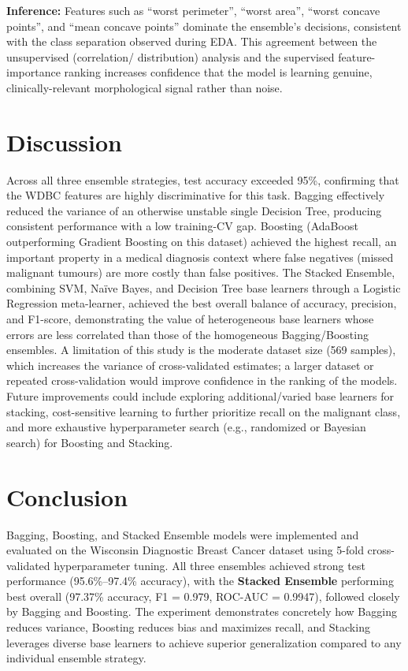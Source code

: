 \documentclass[12pt,a4paper]{article}
\begin{document}
\textbf{Inference:} Features such as ``worst perimeter'', ``worst area'', ``worst concave
points'', and ``mean concave points'' dominate the ensemble's decisions, consistent with the
class separation observed during EDA. This agreement between the unsupervised (correlation/
distribution) analysis and the supervised feature-importance ranking increases confidence that
the model is learning genuine, clinically-relevant morphological signal rather than noise.

\section{Discussion}
Across all three ensemble strategies, test accuracy exceeded 95\%, confirming that the WDBC
features are highly discriminative for this task. Bagging effectively reduced the variance of an
otherwise unstable single Decision Tree, producing consistent performance with a low
training-CV gap. Boosting (AdaBoost outperforming Gradient Boosting on this dataset) achieved the
highest recall, an important property in a medical diagnosis context where false negatives
(missed malignant tumours) are more costly than false positives. The Stacked Ensemble, combining
SVM, Na\"ive Bayes, and Decision Tree base learners through a Logistic Regression meta-learner,
achieved the best overall balance of accuracy, precision, and F1-score, demonstrating the value
of heterogeneous base learners whose errors are less correlated than those of the homogeneous
Bagging/Boosting ensembles. A limitation of this study is the moderate dataset size (569 samples),
which increases the variance of cross-validated estimates; a larger dataset or repeated
cross-validation would improve confidence in the ranking of the models. Future improvements could
include exploring additional/varied base learners for stacking, cost-sensitive learning to further
prioritize recall on the malignant class, and more exhaustive hyperparameter search (e.g.,
randomized or Bayesian search) for Boosting and Stacking.

\section{Conclusion}
Bagging, Boosting, and Stacked Ensemble models were implemented and evaluated on the Wisconsin
Diagnostic Breast Cancer dataset using 5-fold cross-validated hyperparameter tuning. All three
ensembles achieved strong test performance (95.6\%--97.4\% accuracy), with the \textbf{Stacked
Ensemble} performing best overall (97.37\% accuracy, F1 = 0.979, ROC-AUC = 0.9947), followed
closely by Bagging and Boosting. The experiment demonstrates concretely how Bagging reduces
variance, Boosting reduces bias and maximizes recall, and Stacking leverages diverse base learners
to achieve superior generalization compared to any individual ensemble strategy.
\end{document}
